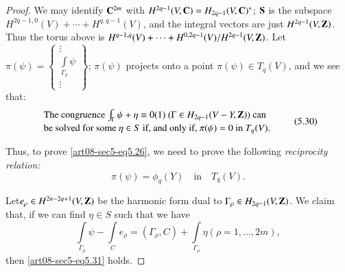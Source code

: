 \begin{proof}
We may identify $\mathbf{C}^{2m}$ with $H^{2q-1}(V,\mathbf{C})=H_{2q-1}(V,\mathbf{C})^{*}$; $\mathbf{S}$ is the subspace $H^{2q-1,0}(V)+\cdots+H^{q,q-1}(V)$, and the integral vectors are just $H^{2q-1}(V,\mathbf{Z})$. Thus the torus above is $H^{q-1,q}(V)+\cdots+H^{0,2q-1}(V)/\break H^{2q-1}(V,\bfZ)$. Let $\pi(\psi)=\left\{\begin{smallmatrix} \vdots\\ \int\limits_{\Gamma_{\rho}}\psi\\ \vdots\end{smallmatrix}\right\}$; $\pi(\psi)$ projects onto a point $\pi(\psi)\in T_{q}(V)$, and we see that:
\begin{equation*}
\begin{array}{l}
\text{The congruence $\int_{\Gamma}\psi+\eta\equiv 0(1)$ $(\Gamma\in H_{2q-1}(V-Y,\mathbf{Z}))$ can}\\[2pt]
\text{be solved for some $\eta\in S$ if, and only if, $\pi(\psi)=0$ in $T_{q}(V)$.}
\end{array}\tag{5.30}\label{art08-sec5-eq5.30}
\end{equation*}

Thus, to prove \eqref{art08-sec5-eq5.26}, we need to prove the following {\em reciprocity relation:}
\begin{equation*}
\pi(\psi)=\phi_{q}(Y)\text{~~ in~~ } T_{q}(V).\tag{5.31}\label{art08-sec5-eq5.31}
\end{equation*}

\eject

Let\pageoriginale $e_{\rho}\in H^{2n-2q+1}(V,\mathbf{Z})$ be the harmonic form dual to $\Gamma_{\rho}\in H_{2q-1}\break (V,\bfZ)$. We claim that, if we can find $\eta\in S$ such that we have
\begin{equation*}
\int\limits_{\Gamma_{\rho}}\psi-\int\limits_{C}e_{\rho}=(\Gamma_{\rho},C)+\int\limits_{\Gamma_{\rho}}\eta(\rho=1,\ldots,2m),\tag{5.32}\label{art08-sec5-eq5.32}
\end{equation*}
then \eqref{art08-sec5-eq5.31} holds.
\end{proof}

